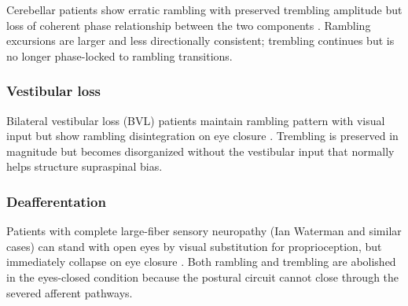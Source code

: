 \documentclass[11pt,twocolumn,a4paper]{article}
\theoremstyle{definition}
\theoremstyle{remark}
\begin{document}
Cerebellar patients show erratic rambling with preserved trembling
amplitude but loss of coherent phase relationship between the two
components \citep{van2011ataxia,morton2004}. Rambling excursions
are larger and less directionally consistent; trembling continues
but is no longer phase-locked to rambling transitions.

\subsubsection{Vestibular loss}

Bilateral vestibular loss (BVL) patients maintain rambling pattern
with visual input but show rambling disintegration on eye closure
\citep{horak2006,cullen2012}. Trembling is preserved in magnitude
but becomes disorganized without the vestibular input that normally
helps structure supraspinal bias.

\subsubsection{Deafferentation}

Patients with complete large-fiber sensory neuropathy (Ian Waterman
and similar cases) can stand with open eyes by visual
substitution for proprioception, but immediately collapse on eye
closure \citep{cole1991,lajoie1996}. Both rambling and trembling
are abolished in the eyes-closed condition because the postural
circuit cannot close through the severed afferent pathways.
\end{document}
